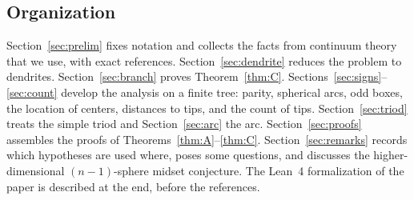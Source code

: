 \documentclass[11pt]{amsart}
\theoremstyle{definition}
\theoremstyle{remark}
\begin{document}
\subsection{Organization}
Section~\ref{sec:prelim} fixes notation and collects the facts from continuum theory that we use, with exact references. Section~\ref{sec:dendrite} reduces the problem to dendrites. Section~\ref{sec:branch} proves Theorem~\ref{thm:C}. Sections~\ref{sec:signs}--\ref{sec:count} develop the analysis on a finite tree: parity, spherical arcs, odd boxes, the location of centers, distances to tips, and the count of tips. Section~\ref{sec:triod} treats the simple triod and Section~\ref{sec:arc} the arc. Section~\ref{sec:proofs} assembles the proofs of Theorems~\ref{thm:A}--\ref{thm:C}. Section~\ref{sec:remarks} records which hypotheses are used where, poses some questions, and discusses the higher-dimensional $(n-1)$-sphere midset conjecture. The Lean~4 formalization of the paper is described at the end, before the references.

\end{document}
